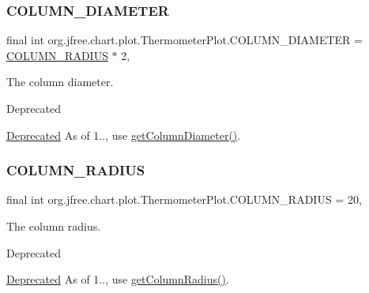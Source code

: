 \subsubsection{\texorpdfstring{C\+O\+L\+U\+M\+N\+\_\+\+D\+I\+A\+M\+E\+T\+ER}{COLUMN\_DIAMETER}}
{\footnotesize\ttfamily final int org.\+jfree.\+chart.\+plot.\+Thermometer\+Plot.\+C\+O\+L\+U\+M\+N\+\_\+\+D\+I\+A\+M\+E\+T\+ER = \mbox{\hyperlink{classorg_1_1jfree_1_1chart_1_1plot_1_1_thermometer_plot_a3418213a2ef914ddb65e6e815a926a20}{C\+O\+L\+U\+M\+N\+\_\+\+R\+A\+D\+I\+US}} $\ast$ 2\hspace{0.3cm}{\ttfamily [static]}, {\ttfamily [protected]}}

The column diameter.

\begin{DoxyRefDesc}{Deprecated}
\item[\mbox{\hyperlink{deprecated__deprecated000088}{Deprecated}}]As of 1.., use \mbox{\hyperlink{classorg_1_1jfree_1_1chart_1_1plot_1_1_thermometer_plot_a2acfcde8d30779ac772e20ff81823598}{get\+Column\+Diameter()}}. \end{DoxyRefDesc}
\mbox{\label{classorg_1_1jfree_1_1chart_1_1plot_1_1_thermometer_plot_a3418213a2ef914ddb65e6e815a926a20}} 
\subsubsection{\texorpdfstring{C\+O\+L\+U\+M\+N\+\_\+\+R\+A\+D\+I\+US}{COLUMN\_RADIUS}}
{\footnotesize\ttfamily final int org.\+jfree.\+chart.\+plot.\+Thermometer\+Plot.\+C\+O\+L\+U\+M\+N\+\_\+\+R\+A\+D\+I\+US = 20\hspace{0.3cm}{\ttfamily [static]}, {\ttfamily [protected]}}

The column radius.

\begin{DoxyRefDesc}{Deprecated}
\item[\mbox{\hyperlink{deprecated__deprecated000087}{Deprecated}}]As of 1.., use \mbox{\hyperlink{classorg_1_1jfree_1_1chart_1_1plot_1_1_thermometer_plot_a74b63300dd2a147c902542e3b3c98085}{get\+Column\+Radius()}}. \end{DoxyRefDesc}
\mbox{\label{classorg_1_1jfree_1_1chart_1_1plot_1_1_thermometer_plot_a6a1a36c4e16f3d12efb53f13bc18d2ef}} 
